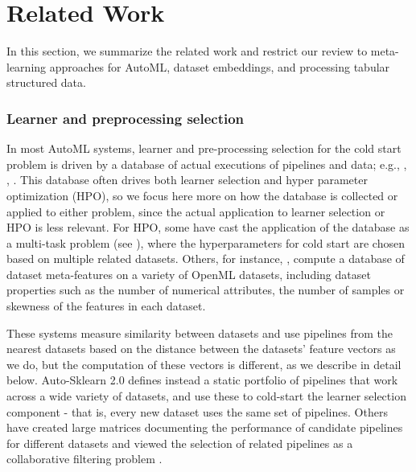 
\section{Related Work}
\label{related_work}

In this section, we summarize the related work and restrict our review to  meta-learning approaches for AutoML, dataset embeddings, and processing tabular structured data. 

\subsubsection*{Learner and preprocessing selection} 
 In most AutoML systems, learner and pre-processing selection for the cold start problem is driven by a database of actual executions of pipelines and data; e.g., \cite{al}, \cite{autosklearn}, \cite{NEURIPS2018_b59a51a3}.  This database often drives both learner selection and hyper parameter optimization (HPO), so we focus here more on how the database is collected or applied to either problem, since the actual application to learner selection or HPO is less relevant.  For HPO, some have cast the application of the database as a multi-task problem (see \cite{multitaskBO}), where the hyperparameters for cold start are chosen based on multiple related datasets. Others, for instance, \cite{autosklearn,Reif2012}, compute a database of dataset meta-features on a variety of OpenML \cite{OpenML} datasets, including dataset properties such as the number of numerical attributes, the number of samples or skewness of the features in each dataset.  
 
These systems measure similarity between datasets and use pipelines from the nearest datasets based on the distance between the datasets' feature vectors as we do, but the computation of these vectors is different, as we describe in detail below.  Auto-Sklearn 2.0 \cite{autosklearn2} defines instead a static portfolio of pipelines that work across a wide variety of datasets, and use these to cold-start the learner selection component - that is, every new dataset uses the same set of pipelines.  Others have created large matrices documenting the performance of candidate pipelines for different datasets and viewed the selection of related pipelines as a collaborative filtering problem \cite{NEURIPS2018_b59a51a3}.
 
